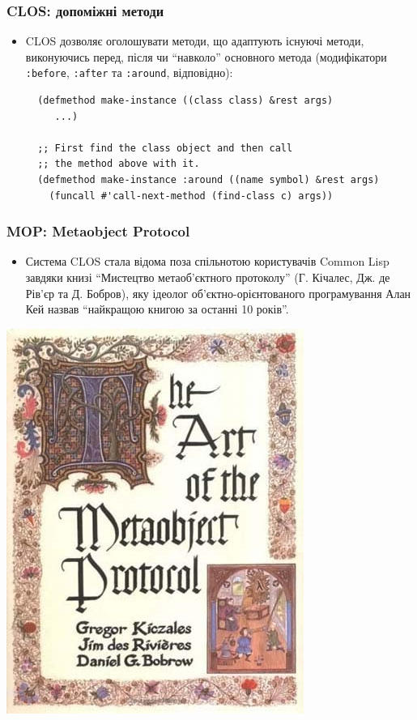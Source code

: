 \documentclass{beamer}
\begin{document}
\begin{frame}[fragile]
  \frametitle{CLOS: допоміжні методи}
  \begin{itemize}
  \item CLOS дозволяє оголошувати методи, що адаптують існуючі методи,
    виконуючись перед, після чи ``навколо'' основного метода (модифікатори
    \texttt{:before}, \texttt{:after} та \texttt{:around}, відповідно):
    \begin{lstlisting}
  (defmethod make-instance ((class class) &rest args)
     ...)

  ;; First find the class object and then call 
  ;; the method above with it.
  (defmethod make-instance :around ((name symbol) &rest args)
    (funcall #'call-next-method (find-class c) args))
    \end{lstlisting}
  \end{itemize}
\end{frame}

\begin{frame}[fragile]
  \frametitle{MOP: Metaobject Protocol}
  \begin{itemize}
  \item Система CLOS стала відома поза спільнотою користувачів Common Lisp
    завдяки книзі ``Мистецтво метаоб'єктного протоколу'' (Г. Кічалес, Дж. де
    Рів'єр та Д. Бобров), яку ідеолог об'єктно-орієнтованого програмування Алан
    Кей назвав ``найкращою книгою за останні 10 років''.
  \end{itemize}
  \begin{center}
    \includegraphics[scale=0.2]{amop}
  \end{center}
\end{frame}
\end{document}
